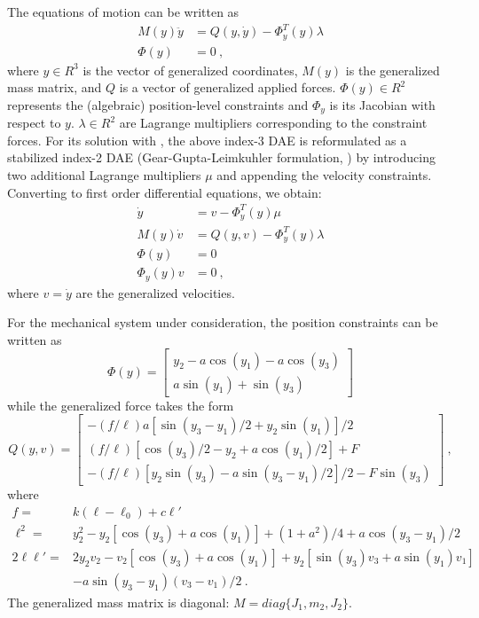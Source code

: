 The equations of motion can be written as
\begin{equation*}
  \begin{split}
    M(y) \ddot y &= Q(y,\dot y) - \Phi_y^T(y) \lambda \\
    \Phi(y)     &= 0 ~,
  \end{split}
\end{equation*}
where $y \in R^3$ is the vector of generalized coordinates, $M(y)$ is the generalized mass
matrix, and $Q$ is a vector of generalized applied forces. $\Phi(y) \in R^2$ represents the
(algebraic) position-level constraints and $\Phi_y$ is its Jacobian with respect to $y$.
$\lambda \in R^2$ are Lagrange multipliers corresponding to the constraint forces.
For its solution with {\idas}, the above index-3 DAE is reformulated as a stabilized 
index-2 DAE (Gear-Gupta-Leimkuhler formulation, \cite{GGL:85}) by introducing two
additional Lagrange multipliers $\mu$ and appending the velocity constraints.
Converting to first order differential equations, we obtain:
\begin{equation}\label{e:GGLform}
\begin{split}
  \dot y &= v - \Phi_y^T(y) \mu  \\
  M(y) \dot v &= Q(y,v) - \Phi_y^T(y) \lambda \\
  \Phi(y)     &= 0 \\
  \Phi_y(y) v &= 0 ~,
\end{split}
\end{equation}
where $v = \dot y$ are the generalized velocities.

For the mechanical system under consideration, the position constraints can be written as
\begin{equation*}
  \Phi(y) = \begin{bmatrix}
    y_2 - a \cos(y_1) - a \cos(y_3) \\
    a \sin(y_1) + \sin(y_3)
  \end{bmatrix}
\end{equation*}
while the generalized force takes the form
\begin{equation*}
  Q(y, v) = \begin{bmatrix}
    - (f/\ell) a [\sin(y_3-y_1)/2 + y_2 \sin(y_1)]/2 \\
    (f/\ell) [\cos(y_3)/2 - y_2 + a \cos(y_1)/2 ] + F \\
    - (f/\ell) [ y_2 \sin(y_3) - a \sin(y_3-y_1)/2]/2 - F \sin(y_3)
  \end{bmatrix} ~,
\end{equation*}
where
\begin{equation*}
  \begin{split}
    f = & k (\ell - \ell_0) + c {\ell}' \\
    \ell^2 = & y_2^2 - y_2 [\cos(y_3) + a \cos(y_1)] + (1 + a^2)/4 + a \cos(y_3-y_1)/2 \\
    2 \ell {\ell}' = & 2 y_2 v_2 - v_2 [\cos(y_3) + a \cos(y_1)] + y_2 [\sin(y_3)v_3 + a\sin(y_1)v_1] \\
    & - a \sin(y_3-y_1) (v_3-v_1)/2 ~.
  \end{split}
\end{equation*}
The generalized mass matrix is diagonal: $M = diag \{J_1, m_2, J_2\}$.

